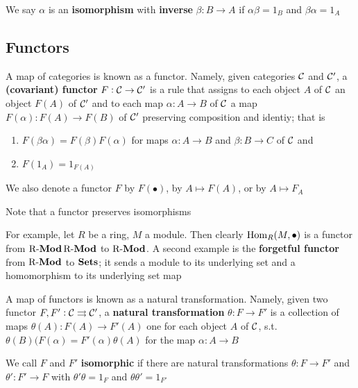 \documentclass[11pt]{article}
\begin{document}
We say \(\alpha\) is an \textbf{isomorphism} with \textbf{inverse} \(\beta:B\to A\) if \(\alpha\beta=1_B\)
and \(\beta\alpha=1_A\)
\subsection*{Functors}
\label{sec:org08140cf}
A map of categories is known as a functor. Namely, given categories \(\mathcal{C}\)
and \(\mathcal{C}'\), a \textbf{(covariant) functor} \(F:\mathcal{C}\to\mathcal{C}'\) is a rule that
assigns to each object \(A\) of \(\mathcal{C}\) an object \(F(A)\) of \(\mathcal{C}'\)
and to each map \(\alpha:A\to B\) of \(\mathcal{C}\) a map \(F(\alpha):F(A)\to F(B)\) of
\(\mathcal{C}'\) preserving composition and identiy; that is
\begin{enumerate}
\item \(F(\beta\alpha)=F(\beta)F(\alpha)\) for maps \(\alpha:A\to B\) and \(\beta:B\to C\) of
\(\mathcal{C}\) and
\item \(F(1_A)=1_{F(A)}\)
\end{enumerate}


We also denote a functor \(F\) by \(F(\bullet)\), by \(A\mapsto F(A)\), or by
\(A\mapsto F_A\)

Note that a functor preserves isomorphisms

For example, let \(R\) be a ring, \(M\) a module. Then clearly
\(\operatorname{Hom}_R(M,\bullet)\) is a functor from \(\operatorname{R-\textbf{Mod}} \operatorname{R-\textbf{Mod}}\) to \(\operatorname{R-\textbf{Mod}}\). A
second example is the \textbf{forgetful functor} from \(\operatorname{R-\textbf{Mod}}\) to \(\operatorname{\textbf{Sets}}\); it sends
a module to its underlying set and a homomorphism to its underlying set map

A map of functors is known as a natural transformation. Namely, given two
functor \(F,F':\mathcal{C}\rightrightarrows\mathcal{C}'\), a \textbf{natural transformation}
\(\theta:F\to F'\) is a collection of maps \(\theta(A):F(A)\to F'(A)\) one for each
object \(A\) of \(\mathcal{C}\), s.t. \(\theta(B)(F(\alpha)=F'(\alpha)\theta(A)\) for the map \(\alpha:A\to B\)
\begin{center}
\end{center}

We call \(F\) and \(F'\) \textbf{isomorphic} if there are natural transformations
\(\theta:F\to F'\) and \(\theta':F'\to F\) with \(\theta'\theta=1_F\) and \(\theta\theta'=1_{F'}\)
\end{document}
